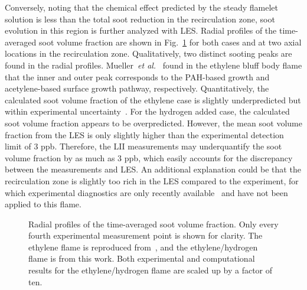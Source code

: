 \documentclass[review,3p,times]{elsarticle}
\begin{document}
Conversely, noting that the chemical effect predicted by the steady flamelet solution is less than the total soot reduction in the recirculation zone, soot evolution in this region is further analyzed with LES.  Radial profiles of the time-averaged soot volume fraction are shown in Fig.~\ref{fig:fv_radial} for both cases and at two axial locations in the recirculation zone.  Qualitatively, two distinct sooting peaks are found in the radial profiles.  Mueller~\emph{et al.}~\cite{mueller13} found in the ethylene bluff body flame that the inner and outer peak corresponds to the PAH-based growth and acetylene-based surface growth pathway, respectively.  Quantitatively, the \textcolor{Rv1}{calculated} soot volume fraction of the ethylene case is slightly underpredicted but within experimental uncertainty~\cite{mueller13}.  For the hydrogen added case, the \textcolor{Rv1}{calculated }soot volume fraction appears to be overpredicted.  However, the mean soot volume fraction from the LES is only slightly higher than the experimental detection limit of 3 ppb.  Therefore, the LII measurements may \textcolor{Rv1}{underquantify} the soot volume fraction by as much as 3 ppb, which easily accounts for the discrepancy between the measurements and LES.  \textcolor{Rv1}{An additional explanation could be that the recirculation zone is slightly too rich in the LES compared to the experiment, for which experimental diagnostics are only recently available~\cite{buxton13} and have not been applied to this flame.}


\begin{figure}[t]
  \centering
  \scriptsize
  \resizebox{0.49\textwidth}{!}{}
  \resizebox{0.49\textwidth}{!}{}
  \vspace{-0.3in}
  \normalsize
  \caption{Radial profiles of the time-averaged soot volume fraction.  Only every fourth experimental measurement point is shown for clarity.  The ethylene flame is reproduced from~\cite{mueller13}, and the ethylene/hydrogen flame is from this work.  Both experimental and computational results for the ethylene/hydrogen flame are scaled up by a factor of ten.}
  \label{fig:fv_radial}
\end{figure}
\end{document}
